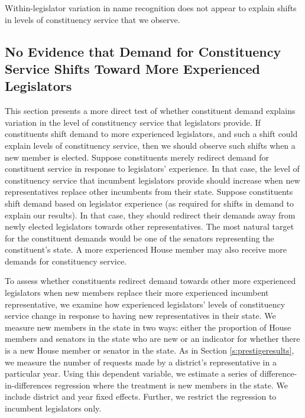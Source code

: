 \documentclass[12pt]{article}
\begin{document}
Within-legislator variation in name recognition does not appear to explain shifts in levels of constituency service that we observe. %



\subsection{No Evidence that Demand for Constituency Service Shifts Toward More Experienced Legislators}
This section presents a more direct test of whether constituent demand explains variation in the level of constituency service that legislators provide. If constituents shift demand to more experienced legislators, and such a shift could explain levels of constituency service, then we should observe such shifts when a new member is elected. Suppose constituents merely redirect demand for constituent service in response to legislators' experience. In that case, the level of constituency service that incumbent legislators provide should increase when new representatives replace other incumbents from their state. Suppose constituents shift demand based on legislator experience (as required for shifts in demand to explain our results). In that case, they should redirect their demands away from newly elected legislators towards other representatives. The most natural target for the constituent demands would be one of the senators representing the constituent's state. A more experienced House member may also receive more demands for constituency service.

To assess whether constituents redirect demand towards other more experienced legislators when new members replace their more experienced incumbent representative, we examine how experienced legislators' levels of constituency service change in response to having new representatives in their state. We measure new members in the state in two ways: either the proportion of House members and senators in the state who are new or an indicator for whether there is a new House member or senator in the state. As in Section \ref{s:prestigeresults}, we measure the number of requests made by a district's representative in a particular year. Using this dependent variable, we estimate a series of difference-in-differences regression where the treatment is new members in the state. We include district and year fixed effects. Further, we restrict the regression to incumbent legislators only.   
\end{document}

